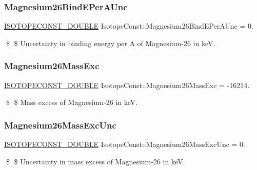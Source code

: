 \subsubsection{\texorpdfstring{Magnesium26\+Bind\+E\+Per\+A\+Unc}{Magnesium26BindEPerAUnc}}
{\footnotesize\ttfamily \mbox{\hyperlink{group___isotope_const-_macros_ga8f45a7272ce02c0b4c65c44636ed719a}{I\+S\+O\+T\+O\+P\+E\+C\+O\+N\+S\+T\+\_\+\+D\+O\+U\+B\+LE}} Isotope\+Const\+::\+Magnesium26\+Bind\+E\+Per\+A\+Unc = 0.}

\$ \$ Uncertainty in binding energy per A of Magnesium-\/26 in keV. \mbox{\label{group___isotope_const-_magnesium-_mg26_ga0372178cd54e989a34bb844d7fca6755}} 
\subsubsection{\texorpdfstring{Magnesium26\+Mass\+Exc}{Magnesium26MassExc}}
{\footnotesize\ttfamily \mbox{\hyperlink{group___isotope_const-_macros_ga8f45a7272ce02c0b4c65c44636ed719a}{I\+S\+O\+T\+O\+P\+E\+C\+O\+N\+S\+T\+\_\+\+D\+O\+U\+B\+LE}} Isotope\+Const\+::\+Magnesium26\+Mass\+Exc = -\/16214.}

\$ \$ Mass excess of Magnesium-\/26 in keV. \mbox{\label{group___isotope_const-_magnesium-_mg26_ga2e005abe824b950981cd54717242c986}} 
\subsubsection{\texorpdfstring{Magnesium26\+Mass\+Exc\+Unc}{Magnesium26MassExcUnc}}
{\footnotesize\ttfamily \mbox{\hyperlink{group___isotope_const-_macros_ga8f45a7272ce02c0b4c65c44636ed719a}{I\+S\+O\+T\+O\+P\+E\+C\+O\+N\+S\+T\+\_\+\+D\+O\+U\+B\+LE}} Isotope\+Const\+::\+Magnesium26\+Mass\+Exc\+Unc = 0.}

\$ \$ Uncertainty in mass excess of Magnesium-\/26 in keV. \mbox{\label{group___isotope_const-_magnesium-_mg26_gab4fbe88d020088316b85bb2e207a9707}} 
